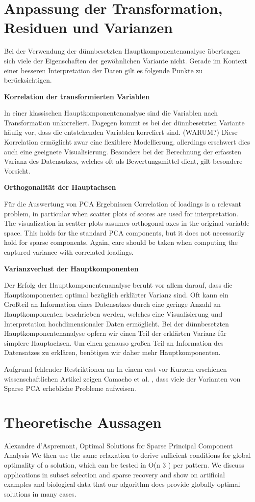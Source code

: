 \section{Anpassung der Transformation, Residuen und Varianzen}

Bei der Verwendung der dünnbesetzten Hauptkomponentenanalyse übertragen sich viele der Eigenschaften der gewöhnlichen Variante nicht. Gerade im Kontext einer besseren Interpretation der Daten gilt es folgende Punkte zu berücksichtigen.

\textbf{Korrelation der transformierten Variablen}

In einer klassischen Hauptkomponentenanalyse sind die Variablen nach Transformation unkorreliert. Dagegen kommt es bei der dünnbesetzten Variante häufig vor, dass die entstehenden Variablen korreliert sind. (WARUM?) Diese Korrelation ermöglicht zwar eine flexiblere Modellierung, allerdings erschwert dies auch eine geeignete Visualisierung. Besonders bei der Berechnung der erfassten Varianz des Datensatzes, welches oft als Bewertungsmittel dient, gilt besondere Vorsicht.

\textbf{Orthogonalität der Hauptachsen}

Für die Auswertung von PCA Ergebnissen
Correlation of loadings is a relevant problem, in particular when
scatter plots of scores are used for interpretation. The visualization in
scatter plots assumes orthogonal axes in the original variable space. This
holds for the standard PCA components, but it does not necessarily hold
for sparse components. Again, care should be taken when computing the
captured variance with correlated loadings.

\textbf{Varianzverlust der Hauptkomponenten}

Der Erfolg der Hauptkomponentenanalyse beruht vor allem darauf, dass die Hauptkomponenten optimal bezüglich erklärter Varianz sind. Oft kann ein Großteil an Information eines Datensatzes durch eine geringe Anzahl an Hauptkomponenten beschrieben werden, welches eine Visualisierung und Interpretation hochdimensionaler Daten ermöglicht. Bei der dünnbesetzten Hauptkomponentenanalyse opfern wir einen Teil der erklärten Varianz für simplere Hauptachsen. Um einen genauso großen Teil an Information des Datensatzes zu erklären, benötigen wir daher mehr Hauptkomponenten.

Aufgrund fehlender Restriktionen an 
In einem erst vor Kurzem erschienen wissenschaftlichen Artikel zeigen Camacho et al. \cite{camacho}, dass viele der Varianten von Sparse PCA erhebliche Probleme aufweisen. 


\section{Theoretische Aussagen} 
\label{spca_theorems}


Alexandre d’Aspremont, Optimal Solutions for Sparse Principal Component Analysis
We then use the same relaxation to derive sufficient conditions for global optimality of a
solution, which can be tested in O(n
3
) per pattern. We discuss applications in subset selection and
sparse recovery and show on artificial examples and biological data that our algorithm does provide
globally optimal solutions in many cases.
